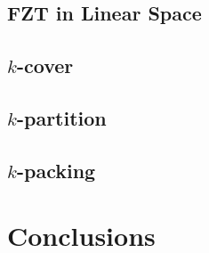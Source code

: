 \documentclass[a4paper, titlepage]{article}
\begin{document}
\subsection{FZT in Linear Space}

\subsection{$k$-cover}

\subsection{$k$-partition}

\subsection{$k$-packing}

\section{Conclusions}
\end{document}

